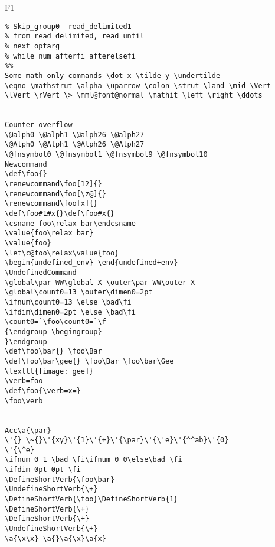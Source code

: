 \documentclass{article}
\begin{document}
\begin{filecontents+}{F1}
\begin{Verbatim}
% Skip_group0  read_delimited1 
% from read_delimited, read_until
% next_optarg 
% while_num afterfi afterelsefi
%% --------------------------------------------------
Some math only commands \dot x \tilde y \undertilde
\eqno \mathstrut \alpha \uparrow \colon \strut \land \mid \Vert
\lVert \rVert \> \mml@font@normal \mathit \left \right \ddots


Counter overflow
\@alph0 \@alph1 \@alph26 \@alph27
\@Alph0 \@Alph1 \@Alph26 \@Alph27
\@fnsymbol0 \@fnsymbol1 \@fnsymbol9 \@fnsymbol10
Newcommand
\def\foo{}
\renewcommand\foo[12]{}
\renewcommand\foo[\z@]{}
\renewcommand\foo[x]{}
\def\foo#1#x{}\def\foo#x{}
\csname foo\relax bar\endcsname
\value{foo\relax bar}
\value{foo}
\let\c@foo\relax\value{foo}
\begin{undefined_env} \end{undefined+env}
\UndefinedCommand
\global\par WW\global X \outer\par WW\outer X 
\global\count0=13 \outer\dimen0=2pt 
\ifnum\count0=13 \else \bad\fi
\ifdim\dimen0=2pt \else \bad\fi
\count0=`\foo\count0=`\f
{\endgroup \begingroup}
}\endgroup
\def\foo\bar{} \foo\Bar
\def\foo\bar\gee{} \foo\Bar \foo\bar\Gee 
\texttt{[image: gee]}
\verb=foo
\def\foo{\verb=x=}
\foo\verb


Acc\a{\par}
\'{} \~{}\'{xy}\'{1}\'{+}\'{\par}\'{\'e}\'{^^ab}\'{0}
\'{\^e}
\ifnum 0 1 \bad \fi\ifnum 0 0\else\bad \fi
\ifdim 0pt 0pt \fi
\DefineShortVerb{\foo\bar}
\UndefineShortVerb{\+}
\DefineShortVerb{\foo}\DefineShortVerb{1}
\DefineShortVerb{\+}
\DefineShortVerb{\+}
\UndefineShortVerb{\+}
\a{\x\x} \a{}\a{\x}\a{x}


\end{Verbatim}
\end{filecontents+}
\end{document}
